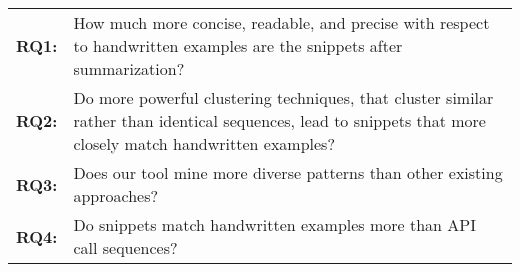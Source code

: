 \begin{tabular}{cp{}}
\toprule
\textbf{RQ1:} & How much more concise, readable, and precise with respect to handwritten examples are the snippets after summarization? \\
\textbf{RQ2:} & Do more powerful clustering techniques, that cluster similar rather than identical sequences, lead to snippets that more closely match handwritten examples? \\
\textbf{RQ3:} & Does our tool mine more diverse patterns than other existing approaches? \\
\textbf{RQ4:} & Do snippets match handwritten examples more than API call sequences? \\
\bottomrule
\end{tabular}